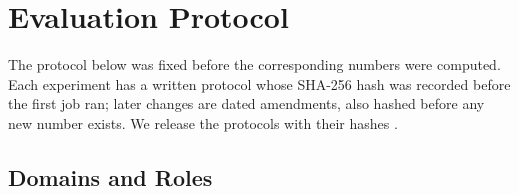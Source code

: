 
\section{Evaluation Protocol}
\label{sec:protocol}

The protocol below was fixed before the corresponding numbers were computed.
Each experiment has a written protocol whose SHA-256 hash was recorded before
the first job ran; later changes are dated amendments, also hashed before any
new number exists.
We release the protocols with their hashes .

\subsection{Domains and Roles}
\label{sec:protocol_domains}

